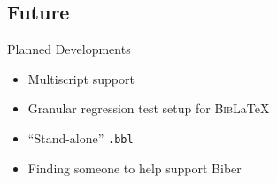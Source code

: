 \documentclass[xcolor=dvipsnames]{beamer}
\def\BibLaTeX{\textsc{Bib}\LaTeX}
\begin{document}
\subsection*{Future}

\begin{frame}{Planned Developments}
  \begin{itemize}
  \item Multiscript support
  \item Granular regression test setup for \BibLaTeX
  \item ``Stand-alone'' \texttt{.bbl}
  \item Finding someone to help support Biber
  \end{itemize}
\end{frame}
\end{document}
